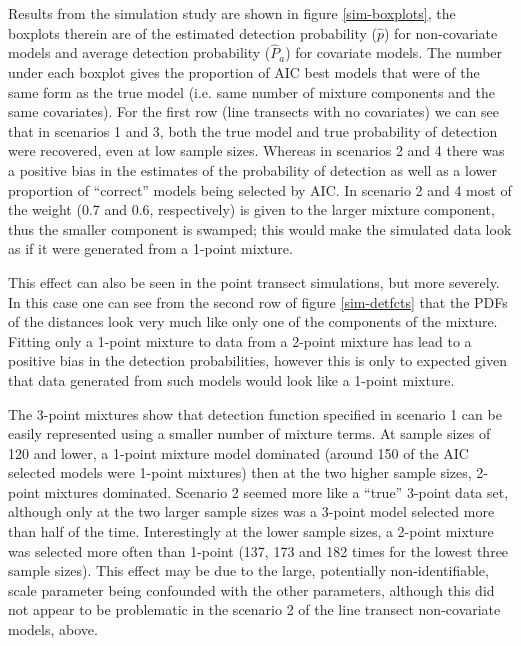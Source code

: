 Results from the simulation study are shown in figure \ref{sim-boxplots}, the boxplots therein are of the estimated detection probability ($\hat{p}$) for non-covariate models and average detection probability ($\hat{P}_a$) for covariate models. The number under each boxplot gives the proportion of AIC best models that were of the same form as the true model (i.e. same number of mixture components and the same covariates). For the first row (line transects with no covariates) we can see that in scenarios 1 and 3, both the true model and true probability of detection were recovered, even at low sample sizes. Whereas in scenarios 2 and 4 there was a positive bias in the estimates of the probability of detection as well as a lower proportion of ``correct'' models being selected by AIC. In scenario 2 and 4 most of the weight (0.7 and 0.6, respectively) is given to the larger mixture component, thus the smaller component is swamped; this would make the simulated data look as if it were generated from a 1-point mixture.

This effect can also be seen in the point transect simulations, but more severely. In this case one can see from the second row of figure \ref{sim-detfcts} that the PDFs of the distances look very much like only one of the components of the mixture. Fitting only a 1-point mixture to data from a 2-point mixture has lead to a positive bias in the detection probabilities, however this is only to expected given that data generated from such models would look like a 1-point mixture.

The 3-point mixtures show that detection function specified in scenario 1 can be easily represented using a smaller number of mixture terms. At sample sizes of 120 and lower, a 1-point mixture model dominated (around 150 of the AIC selected models were 1-point mixtures) then at the two higher sample sizes, 2-point mixtures dominated. Scenario 2 seemed more like a ``true'' 3-point data set, although only at the two larger sample sizes was a 3-point model selected more than half of the time. Interestingly at the lower sample sizes, a 2-point mixture was selected more often than 1-point (137, 173 and 182 times for the lowest three sample sizes). This effect may be due to the large, potentially non-identifiable, scale parameter being confounded with the other parameters, although this did not appear to be problematic in the scenario 2 of the line transect non-covariate models, above.

